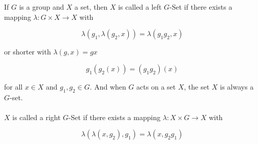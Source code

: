 \documentclass[12pt]{article}
\begin{document}
If $G$ is a group and $X$ a set, then $X$ is called a left $G$-Set if there exists a mapping $\lambda : G \times X \rightarrow X$ with

$$
  \lambda(g_1,\lambda(g_2,x)) = \lambda(g_1 g_2, x)
$$

or shorter with $\lambda(g,x) = gx$

$$
  g_1(g_2(x)) = (g_1 g_2)(x)
$$

for all $x \in X$ and $g_1,g_2 \in G$. And when $G$ acts on a set $X$, the set $X$ is always a $G$-set. \\ \\


$X$ is called a right $G$-Set if there exists a mapping $\lambda : X \times G \rightarrow X$ with

$$
  \lambda(\lambda(x,g_2),g_1) = \lambda(x,g_2 g_1)
$$
\end{document}
